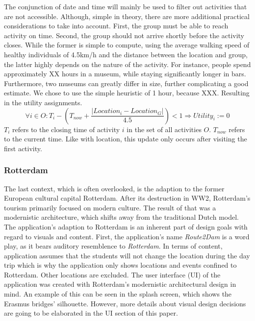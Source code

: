 \documentclass[11pt,a4paper,oneside]{article}
\begin{document}
The conjunction of date and time will mainly be used to filter out activities that are not accessible. Although, simple in theory, there are more additional practical considerations to take into account. First, the group must be able to reach activity on time. Second, the group should not arrive shortly before the activity closes. While the former is simple to compute, using the average walking speed of healthy individuals of 4.5km/h and the distance between the location and group, the latter highly depends on the nature of the activity. For instance, people spend approximately XX hours in a museum, while staying significantly longer in bars.\cite{MUSEUM} Furthermore, two museums can greatly differ in size, further complicating a good estimate. We chose to use the simple heuristic of 1 hour, because XXX. Resulting in the utility assignments. 
\begin{equation}
    \forall i \in O: T_i - (T_{now} + \frac{\lvert Location_i - Location_G \rvert}{4.5}) < 1 \Rightarrow Utility_i := 0
\end{equation}
$T_i$ refers to the closing time of activity $i$ in the set of all activities $O$. $T_{now}$ refers to the current time. Like with location, this update only occurs after visiting the first activity. 

\subsubsection{Rotterdam}
The last context, which is often overlooked, is the  adaption to the former European cultural capital Rotterdam.\cite{hitters_SocialPoliticalConstruction_2000} After its destruction in WW2, Rotterdam's tourism primarily focused on modern culture.\cite{rotterdam} The result of that was a modernistic architecture, which shifts away from the traditional Dutch model. The application's adaption to Rotterdam is an inherent part of design goals with regard to visuals and content. First, the application's name \emph{Route2Dam} is a word play, as it bears auditory resemblence to \emph{Rotterdam}. In terms of content, application assumes that the students will not change the location during the day trip which is why the application only shows locations and events confined to Rotterdam. Other locations are excluded. The user interface (UI) of the application was created with Rotterdam's modernistic architectural design in mind. An example of this can be seen in the splash screen, which shows the Erasmus bridges' silhouette. However, more details about visual design decisions are going to be elaborated in the UI section of this paper.
\end{document}
